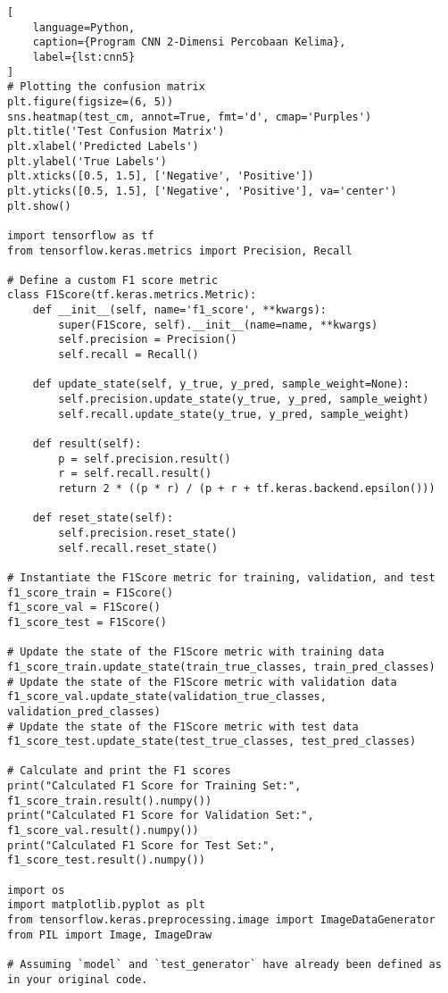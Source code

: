 \begin{lstlisting}[
    language=Python,
    caption={Program CNN 2-Dimensi Percobaan Kelima},
    label={lst:cnn5}
]
# Plotting the confusion matrix
plt.figure(figsize=(6, 5))
sns.heatmap(test_cm, annot=True, fmt='d', cmap='Purples')
plt.title('Test Confusion Matrix')
plt.xlabel('Predicted Labels')
plt.ylabel('True Labels')
plt.xticks([0.5, 1.5], ['Negative', 'Positive'])
plt.yticks([0.5, 1.5], ['Negative', 'Positive'], va='center')
plt.show()

import tensorflow as tf
from tensorflow.keras.metrics import Precision, Recall

# Define a custom F1 score metric
class F1Score(tf.keras.metrics.Metric):
    def __init__(self, name='f1_score', **kwargs):
        super(F1Score, self).__init__(name=name, **kwargs)
        self.precision = Precision()
        self.recall = Recall()

    def update_state(self, y_true, y_pred, sample_weight=None):
        self.precision.update_state(y_true, y_pred, sample_weight)
        self.recall.update_state(y_true, y_pred, sample_weight)

    def result(self):
        p = self.precision.result()
        r = self.recall.result()
        return 2 * ((p * r) / (p + r + tf.keras.backend.epsilon()))

    def reset_state(self):
        self.precision.reset_state()
        self.recall.reset_state()

# Instantiate the F1Score metric for training, validation, and test
f1_score_train = F1Score()
f1_score_val = F1Score()
f1_score_test = F1Score()

# Update the state of the F1Score metric with training data
f1_score_train.update_state(train_true_classes, train_pred_classes)
# Update the state of the F1Score metric with validation data
f1_score_val.update_state(validation_true_classes, validation_pred_classes)
# Update the state of the F1Score metric with test data
f1_score_test.update_state(test_true_classes, test_pred_classes)

# Calculate and print the F1 scores
print("Calculated F1 Score for Training Set:", f1_score_train.result().numpy())
print("Calculated F1 Score for Validation Set:", f1_score_val.result().numpy())
print("Calculated F1 Score for Test Set:", f1_score_test.result().numpy())

import os
import matplotlib.pyplot as plt
from tensorflow.keras.preprocessing.image import ImageDataGenerator
from PIL import Image, ImageDraw

# Assuming `model` and `test_generator` have already been defined as in your original code.


\end{lstlisting}
